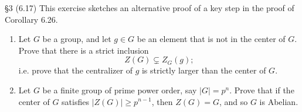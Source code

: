 \documentclass{homework}
\begin{document}
\begin{problem}{\S 3}
  (6.17) This exercise sketches an alternative proof of a key step in the proof of Corollary 6.26. 
  \begin{enumerate}[label=(\alph*)]
    \item Let $G$ be a group, and let $g\in G$ be an element that is not in the center of $G$. Prove
      that there is a strict inclusion \[
        Z(G)\subsetneq Z_G(g)
      ;\] i.e. prove that the centralizer of $g$ is strictly larger than the center of $G$.
    \item Let $G$ be a finite group of prime power order, say $\left| G \right| =p^n$. Prove that if
      the center of $G$ satisfies $\left| Z(G) \right| \ge p^{n-1}$, then $Z(G)=G$, and so $G$ is
      Abelian. 
  \end{enumerate}
\end{problem}
\end{document}
